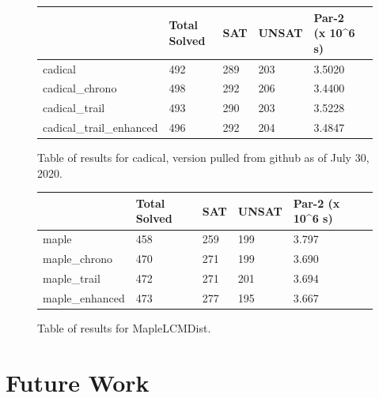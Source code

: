 \documentclass[runningheads]{llncs}
\begin{document}
\begin{figure}
    \begin{tabular}{|l|l|l|l|l|l|}
      \hline
      & Total Solved & SAT & UNSAT & Par-2 (x 10\textasciicircum{}6 s) \\ \hline
      cadical                  & 492          & 289 &  203  & 3.5020                            \\ \hline
      cadical\_chrono          & 498          & 292 &  206  & 3.4400                            \\ \hline
      cadical\_trail           & 493          & 290 &  203  & 3.5228                            \\ \hline
      cadical\_trail\_enhanced & 496          & 292 &  204  & 3.4847                            \\ \hline
    \end{tabular}
    \caption{Table of results for cadical, version pulled from github as of July 30, 2020.}
\end{figure}

\begin{figure}
    \begin{tabular}{|l|l|l|l|l|l|}
      \hline
      & Total Solved & SAT & UNSAT & Par-2 (x 10\textasciicircum{}6 s) \\ \hline
      maple           & 458          & 259 &  199  & 3.797                             \\ \hline
      maple\_chrono   & 470          & 271 &  199  & 3.690                             \\ \hline
      maple\_trail    & 472          & 271 &  201  & 3.694                             \\ \hline
      maple\_enhanced & 473          & 277 &  195  & 3.667                             \\ \hline
    \end{tabular}
    \caption{Table of results for MapleLCMDist.}
\end{figure}
\clearpage

\section{Future Work}
\end{document}
